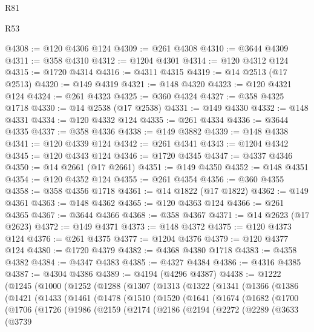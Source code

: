 \begin{lexlean}{R81}
\begin{lexlean}{R53}
\begin{coremodule}
{{{{{{{{{{{{{{{{{{{{{{{{{{{{{{{{{{{{{{{{{{{{{{{{{{{{{{{{{{{{{{{{{{{{{{{{{{{{{{{{{{{{{{{{{{{{{{{{{{{{{{{{{{{{{{{{@4308 := @120 @4306 @124
@4309 := @261 @4308
@4310 := @3644 @4309
@4311 := @358 @4310
@4312 := @1204 @4301
@4314 := @120 @4312 @124
@4315 := @1720 @4314
@4316 := @4311 @4315
@4319 := @14 @2513 (@17 @2513)
@4320 := @149 @4319
@4321 := @148 @4320
@4323 := @120 @4321 @124
@4324 := @261 @4323
@4325 := @360 @4324
@4327 := @358 @4325 @1718
@4330 := @14 @2538 (@17 @2538)
@4331 := @149 @4330
@4332 := @148 @4331
@4334 := @120 @4332 @124
@4335 := @261 @4334
@4336 := @3644 @4335
@4337 := @358 @4336
@4338 := @149 @3882
@4339 := @148 @4338
@4341 := @120 @4339 @124
@4342 := @261 @4341
@4343 := @1204 @4342
@4345 := @120 @4343 @124
@4346 := @1720 @4345
@4347 := @4337 @4346
@4350 := @14 @2661 (@17 @2661)
@4351 := @149 @4350
@4352 := @148 @4351
@4354 := @120 @4352 @124
@4355 := @261 @4354
@4356 := @360 @4355
@4358 := @358 @4356 @1718
@4361 := @14 @1822 (@17 @1822)
@4362 := @149 @4361
@4363 := @148 @4362
@4365 := @120 @4363 @124
@4366 := @261 @4365
@4367 := @3644 @4366
@4368 := @358 @4367
@4371 := @14 @2623 (@17 @2623)
@4372 := @149 @4371
@4373 := @148 @4372
@4375 := @120 @4373 @124
@4376 := @261 @4375
@4377 := @1204 @4376
@4379 := @120 @4377 @124
@4380 := @1720 @4379
@4382 := @4368 @4380 @1718
@4383 := @4358 @4382
@4384 := @4347 @4383
@4385 := @4327 @4384
@4386 := @4316 @4385
@4387 := @4304 @4386
@4389 := @4194 (@4296 @4387)
@4438 := @1222
    (@1245
      (@1000
        (@1252
          (@1288
            (@1307
              (@1313
                (@1322
                  (@1341
                    (@1366
                      (@1386
                        (@1421
                          (@1433
                            (@1461
                              (@1478
                                (@1510
                                  (@1520
                                    (@1641
                                      (@1674
                                        (@1682
                                          (@1700
                                            (@1706
                                              (@1726
                                                (@1986
                                                  (@2159
                                                    (@2174
                                                      (@2186
                                                        (@2194
                                                          (@2272
                                                            (@2289
                                                              (@3633
                                                                (@3739
}}}}}}}}}}}}}}}}}}}}}}}}}}}}}}}}}}}}}}}}}}}}}}}}}}}}}}}}}}}}}}}}}}}}}}}}}}}}}}}}}}}}}}}}}}}}}}}}}}}}}}}}}}}}}}}}
\end{coremodule}
\end{lexlean}
\end{lexlean}
